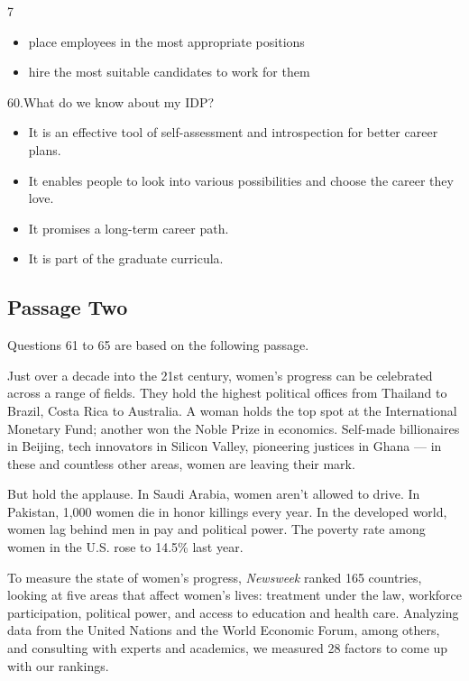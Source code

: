 \documentclass[UTF8,11pt]{ctexart}
\begin{document}
7


\begin{itemize}[leftmargin=2em,itemsep=.2em,topsep=.4em]\item[C.] place employees in the most appropriate positions
\item[D.] hire the most suitable candidates to work for them
\end{itemize}

60.What do we know about my IDP?


\begin{itemize}[leftmargin=2em,itemsep=.2em,topsep=.4em]\item[A.] It is an effective tool of self-assessment and introspection for better career plans.
\item[B.] It enables people to look into various possibilities and choose the career they love.
\item[C.] It promises a long-term career path.
\item[D.] It is part of the graduate curricula.
\end{itemize}

\subsection*{Passage Two}


Questions 61 to 65 are based on the following passage.


Just over a decade into the 21st century, women’s progress can be celebrated across a range of fields. They hold the highest political offices from Thailand to Brazil, Costa Rica to Australia. A woman holds the top spot at the International Monetary Fund; another won the Noble Prize in economics. Self-made billionaires in Beijing, tech innovators in Silicon Valley, pioneering justices in Ghana — in these and countless other areas, women are leaving their mark.


But hold the applause. In Saudi Arabia, women aren’t allowed to drive. In Pakistan, 1,000 women die in honor killings every year. In the developed world, women lag behind men in pay and political power. The poverty rate among women in the U.S. rose to 14.5\% last year.


To measure the state of women’s progress,\textit{ Newsweek} ranked 165 countries, looking at five areas that affect women’s lives: treatment under the law, workforce participation, political power, and access to education and health care. Analyzing data from the United Nations and the World Economic Forum, among others, and consulting with experts and academics, we measured 28 factors to come up with our rankings.
\end{document}
